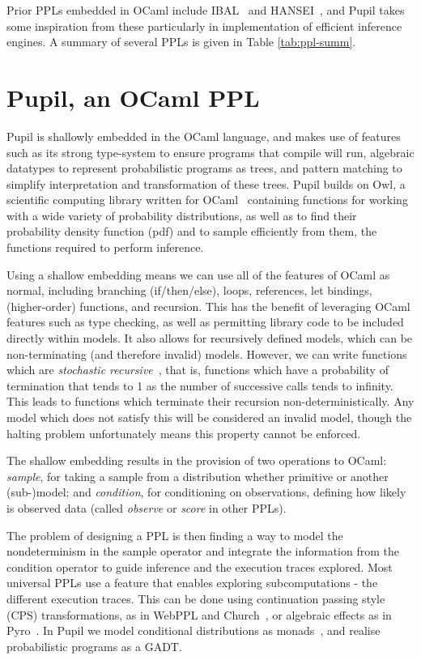 \documentclass[sigconf]{acmart}
\newcommand{\pupil}{Pupil\xspace}
\begin{document}
Prior PPLs embedded in OCaml include IBAL~\cite{ibal} and HANSEI~\cite{kiselyov2009embedded}, and \pupil takes some inspiration from these particularly in implementation of efficient inference engines. A summary of several PPLs is given in Table \ref{tab:ppl-summ}.

\section{\pupil, an OCaml PPL}
\label{s:pupil}

\pupil is shallowly embedded in the OCaml language, and makes use of features such as its strong type-system to ensure programs that compile will run, algebraic datatypes to represent probabilistic programs as trees, and pattern matching to simplify interpretation and transformation of these trees. \pupil builds on Owl, a scientific computing library written for OCaml~\cite{owl} containing functions for working with a wide variety of probability distributions, as well as to find their probability density function (pdf) and to sample efficiently from them, the functions required to perform inference.

Using a shallow embedding means we can use all of the features of OCaml as normal, including branching (if/then/else), loops, references, let bindings, (higher-order) functions, and recursion. This has the benefit of leveraging OCaml features such as type checking, as well as permitting library code to be included directly within models. It also allows for recursively defined models, which can be non-terminating (and therefore invalid) models. However, we can write functions which are \textit{stochastic recursive}~\cite{siegmund}, that is, functions which have a probability of termination that tends to 1 as the number of successive calls tends to infinity. This leads to functions which terminate their recursion non-deterministically. Any model which does not satisfy this will be considered an invalid model, though the halting problem unfortunately means this property cannot be enforced.

The shallow embedding results in the provision of two operations to OCaml: \emph{sample}, for taking a sample from a distribution whether primitive or another (sub-)model; and \emph{condition}, for conditioning on observations, defining how likely is observed data (called \emph{observe} or \emph{score} in other PPLs).

The problem of designing a PPL is then finding a way to model the nondeterminism in the sample operator and integrate the information from the condition operator to guide inference and the execution traces explored. Most universal PPLs use a feature that enables exploring subcomputations - the different execution traces. This can be done using continuation passing style (CPS) transformations, as in WebPPL and Church~\cite{mobus2018structure,goodman2012church}, or algebraic effects as in Pyro~\cite{bingham2019pyro}. In \pupil we model conditional distributions as monads~\cite{scibior2015practical}, and realise probabilistic programs as a GADT.
\end{document}
